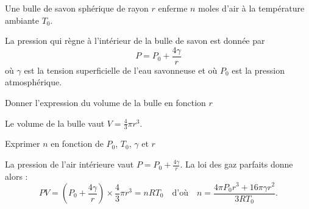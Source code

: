 \hauteurLargeurCadreReponse		{7mm}{4cm}
\typeEntrainement				{} %
\initialisationEntrainement

Une bulle de savon sphérique de rayon $r$ enferme $n$ moles d'air à la température ambiante $T_0$.   

La pression qui règne à l'intérieur de la bulle de savon est donnée par 
\[
P=P_0+\frac{4\gamma}{r}
\]
où $\gamma$ est la tension superficielle de l'eau savonneuse et où $P_0$ est la pression atmosphérique.


\debutEntrainement




\begin{enonce}
Donner l'expression du volume de la bulle en fonction $r$
\end{enonce}


\begin{corrige}
Le volume de la bulle vaut $V=\frac43 \pi r^3$.
\end{corrige}




\begin{enonce}
Exprimer $n$ en fonction de $P_0$, $T_0$, $\gamma$ et $r$
\end{enonce}


\begin{corrige}
La pression de l'air intérieure vaut $P=P_0+\frac{4\gamma}{r}$. La loi des gaz parfaits donne alors :
\[
PV = \left(P_0+\frac{4\gamma}{r}\right) \times \frac43 \pi r^3=nRT_0
\quad\text{d'où}\quad
n=\frac{4\pi P_0r^3+16\pi\gamma r^2}{3RT_0}.
\]
\end{corrige}

